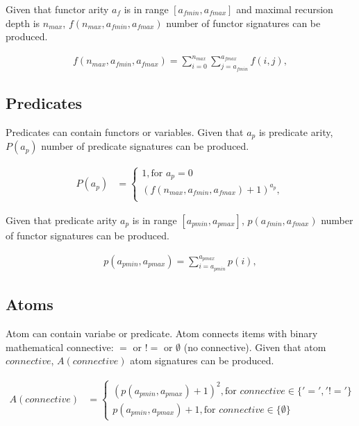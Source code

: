 Given that functor arity $a_f$ is in range $[a_{fmin}, a_{fmax}]$  and maximal recursion depth is $n_{max}$, $f(n_{max}, a_{fmin}, a_{fmax})$ number of functor signatures can be produced.

\begin{align}
	f(n_{max}, a_{fmin}, a_{fmax}) = \sum_{i=0}^{n_{max}} \sum_{j=a_{fmin}}^{a_{fmax}} f(i, j),
\end{align}

\subsection{Predicates}

Predicates can contain functors or variables.
Given that $a_p$ is predicate arity, $P(a_p)$ number of predicate signatures can be produced.

\begin{align}
	P(a_p) &=
	\begin{cases}
		1, \text{for } a_p = 0 \\
		(f(n_{max}, a_{fmin}, a_{fmax}) + 1)^{a_p}, \\
	\end{cases}
\end{align}

Given that predicate arity $a_p$ is in range $[a_{pmin}, a_{pmax}]$, $p(a_{fmin}, a_{fmax})$ number of functor signatures can be produced.

\begin{align}
	p(a_{pmin}, a_{pmax}) = \sum_{i=a_{pmin}}^{a_{pmax}} p(i),
\end{align}

\subsection{Atoms}

Atom can contain variabe or predicate. Atom connects items with binary mathematical connective: $=$ or $!=$ or $\emptyset$ (no connective).
Given that atom $connective$, $A(connective)$ atom signatures can be produced.

\begin{align}
	A(connective) &= 
  \begin{cases}
    (p(a_{pmin}, a_{pmax}) + 1)^{2}, \text{for } connective \in \{'=', '!='\} \\
    p(a_{pmin}, a_{pmax}) + 1, \text{for } connective \in \{\emptyset\}
  \end{cases}
\end{align}

